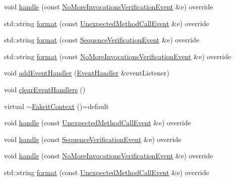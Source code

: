 \begin{DoxyCompactItemize}
\item 
void \mbox{\hyperlink{structfakeit_1_1FakeitContext_a09e2d757900d3c49a1b17694fa0395f1}{handle}} (const \mbox{\hyperlink{structfakeit_1_1NoMoreInvocationsVerificationEvent}{No\+More\+Invocations\+Verification\+Event}} \&e) override
\item 
std\+::string \mbox{\hyperlink{structfakeit_1_1FakeitContext_a4da398d63e45c922606bbd5aaff30f6e}{format}} (const \mbox{\hyperlink{structfakeit_1_1UnexpectedMethodCallEvent}{Unexpected\+Method\+Call\+Event}} \&e) override
\item 
std\+::string \mbox{\hyperlink{structfakeit_1_1FakeitContext_af163c4c51929ef14c1c5529f2f42c40b}{format}} (const \mbox{\hyperlink{structfakeit_1_1SequenceVerificationEvent}{Sequence\+Verification\+Event}} \&e) override
\item 
std\+::string \mbox{\hyperlink{structfakeit_1_1FakeitContext_a49fae6e849a57fff6906a1a313fb4267}{format}} (const \mbox{\hyperlink{structfakeit_1_1NoMoreInvocationsVerificationEvent}{No\+More\+Invocations\+Verification\+Event}} \&e) override
\item 
void \mbox{\hyperlink{structfakeit_1_1FakeitContext_a176ad0df1fcb2758648f2c9b6c8fdd0d}{add\+Event\+Handler}} (\mbox{\hyperlink{structfakeit_1_1EventHandler}{Event\+Handler}} \&event\+Listener)
\item 
void \mbox{\hyperlink{structfakeit_1_1FakeitContext_a65960b8d910f35fa5c3f596f693e5c17}{clear\+Event\+Handlers}} ()
\item 
virtual \mbox{\hyperlink{structfakeit_1_1FakeitContext_adfad726870dfba97246a9ddfddd3a3d5}{$\sim$\+Fakeit\+Context}} ()=default
\item 
void \mbox{\hyperlink{structfakeit_1_1FakeitContext_ac39067234f37a88f6c19440df0bc1b32}{handle}} (const \mbox{\hyperlink{structfakeit_1_1UnexpectedMethodCallEvent}{Unexpected\+Method\+Call\+Event}} \&e) override
\item 
void \mbox{\hyperlink{structfakeit_1_1FakeitContext_a6b77f1360c9f8f4165e1152173789d6e}{handle}} (const \mbox{\hyperlink{structfakeit_1_1SequenceVerificationEvent}{Sequence\+Verification\+Event}} \&e) override
\item 
void \mbox{\hyperlink{structfakeit_1_1FakeitContext_a09e2d757900d3c49a1b17694fa0395f1}{handle}} (const \mbox{\hyperlink{structfakeit_1_1NoMoreInvocationsVerificationEvent}{No\+More\+Invocations\+Verification\+Event}} \&e) override
\item 
std\+::string \mbox{\hyperlink{structfakeit_1_1FakeitContext_a4da398d63e45c922606bbd5aaff30f6e}{format}} (const \mbox{\hyperlink{structfakeit_1_1UnexpectedMethodCallEvent}{Unexpected\+Method\+Call\+Event}} \&e) override

\end{DoxyCompactItemize}
